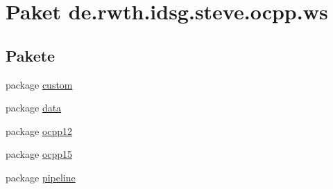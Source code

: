 \hypertarget{namespacede_1_1rwth_1_1idsg_1_1steve_1_1ocpp_1_1ws}{\section{Paket de.\+rwth.\+idsg.\+steve.\+ocpp.\+ws}
\label{namespacede_1_1rwth_1_1idsg_1_1steve_1_1ocpp_1_1ws}
}
\subsection*{Pakete}
\begin{DoxyCompactItemize}
\item 
package \hyperlink{namespacede_1_1rwth_1_1idsg_1_1steve_1_1ocpp_1_1ws_1_1custom}{custom}
\item 
package \hyperlink{namespacede_1_1rwth_1_1idsg_1_1steve_1_1ocpp_1_1ws_1_1data}{data}
\item 
package \hyperlink{namespacede_1_1rwth_1_1idsg_1_1steve_1_1ocpp_1_1ws_1_1ocpp12}{ocpp12}
\item 
package \hyperlink{namespacede_1_1rwth_1_1idsg_1_1steve_1_1ocpp_1_1ws_1_1ocpp15}{ocpp15}
\item 
package \hyperlink{namespacede_1_1rwth_1_1idsg_1_1steve_1_1ocpp_1_1ws_1_1pipeline}{pipeline}
\end{DoxyCompactItemize}
